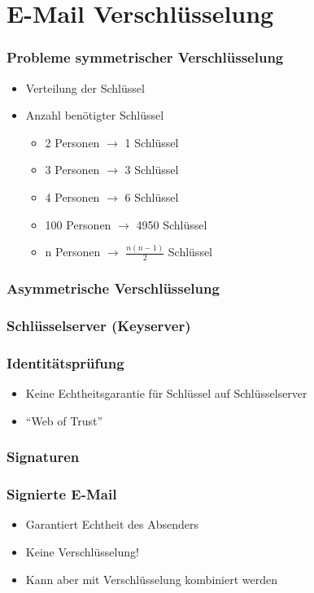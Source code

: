\section{E-Mail Verschlüsselung}

\begin{frame}
  \frametitle{Probleme symmetrischer Verschlüsselung}
  \begin{itemize}
    \item Verteilung der Schlüssel
    \item Anzahl benötigter Schlüssel
    \begin{itemize}
      \item 2 Personen $\rightarrow$ 1 Schlüssel
      \item 3 Personen $\rightarrow$ 3 Schlüssel
      \item 4 Personen $\rightarrow$ 6 Schlüssel
      \item 100 Personen $\rightarrow$ 4950 Schlüssel
      \item n Personen $\rightarrow$ $\frac{n(n-1)}{2}$ Schlüssel
    \end{itemize}
  \end{itemize}

\end{frame}

\begin{frame}
   \frametitle{Asymmetrische Verschlüsselung}
   
\end{frame}

\begin{frame}
  \frametitle{Schlüsselserver (Keyserver)}
\end{frame}

\begin{frame}
  \frametitle{Identitätsprüfung}
  \begin{itemize}
    \item Keine Echtheitsgarantie für Schlüssel auf Schlüsselserver
    \item ``Web of Trust''
  \end{itemize}
\end{frame}

\begin{frame}
  \frametitle{Signaturen}
\end{frame}

\begin{frame}
  \frametitle{Signierte E-Mail}
  \begin{itemize}
    \item Garantiert Echtheit des Absenders
    \item Keine Verschlüsselung!
    \item Kann aber mit Verschlüsselung kombiniert werden
  \end{itemize}
\end{frame}